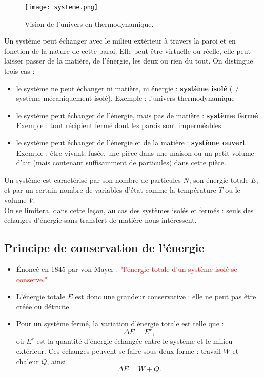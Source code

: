 \documentclass[11pt,a4paper]{report}
\begin{document}
\begin{figure}[h!]
\begin{center}
	\texttt{[image: systeme.png]}
	\caption{Vision de l'univers en thermodynamique.}
	\label{fig:systeme}
\end{center}
\end{figure}

Un système peut échanger avec le milieu extérieur à travers la paroi et en fonction de la nature de cette paroi. Elle peut être virtuelle ou réelle, elle peut laisser passer de la matière, de l'énergie, les deux ou rien du tout. On distingue trois cas :
\begin{itemize}
	\item le système ne peut échanger ni matière, ni énergie : \textbf{système isolé} ($\neq$ système mécaniquement isolé).
	Exemple : l'univers thermodynamique
	\item le système peut échanger de l'énergie, mais pas de matière : \textbf{système fermé}.
	Exemple : tout récipient fermé dont les parois sont imperméables.
	\item le système peut échanger de l'énergie et de la matière : \textbf{système ouvert}.
	Exemple : être vivant, fusée, une pièce dans une maison ou un petit volume d'air (mais contenant suffisamment de particules) dans cette pièce.\\
\end{itemize}

Un système est caractérisé par son nombre de particules $N$, son énergie totale $E$, et par un certain nombre de variables d'état comme la température $T$ ou le volume $V$.\\

On se limitera, dans cette leçon, au cas des systèmes isolés et fermés : seuls des échanges d'énergie sans transfert de matière nous intéressent.

\subsection{Principe de conservation de l'énergie}

\begin{itemize}
	\item \'Enoncé en 1845 par von Mayer : \textcolor{red}{"l'énergie totale d'un système isolé se conserve."}\\
	
	\item L'énergie totale $E$ est donc une grandeur conservative : elle ne peut pas être créée ou détruite.\\
	
	\item Pour un système fermé, la variation d'énergie totale est telle que :
	\begin{equation}
		\Delta E = E^r,
	\end{equation}
	où $E^r$ est la quantité d'énergie échangée entre le système et le milieu extérieur. Ces échanges peuvent se faire sous deux forme : travail $W$ et chaleur $Q$, ainsi
	\begin{equation}
		\Delta E = W + Q.
	\end{equation}
\end{itemize}
\end{document}
